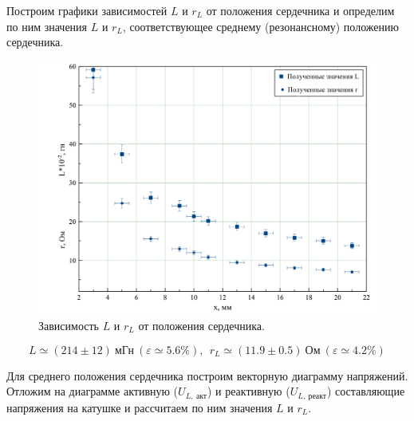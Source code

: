 \documentclass[a4paper, 12pt, twoside]{article}
\begin{document}
Построим графики зависимостей $L$ и $r_L$ от положения сердечника и определим по ним значения $L$ и $r_L$, соответствующее среднему (резонансному) положению сердечника.

\begin{figure}[H]
	\centering
	\includegraphics[width = 0.8\linewidth]{itog}
	\caption{Зависимость $L$ и $r_L$ от положения сердечника.}
\end{figure}

$$L \simeq (214\pm 12)~\text{мГн}~(\varepsilon \simeq 5.6 \%),~~r_L \simeq (11.9 \pm 0.5)~\text{Ом}~(\varepsilon \simeq 4.2 \%)$$


Для среднего положения сердечника построим векторную диаграмму напряжений. Отложим на диаграмме активную ($U_{L,~\text{акт}}$) и реактивную ($U_{L,~\text{реакт}}$) составляющие напряжения на катушке и рассчитаем по ним значения $L$ и $r_L$.
\end{document}
